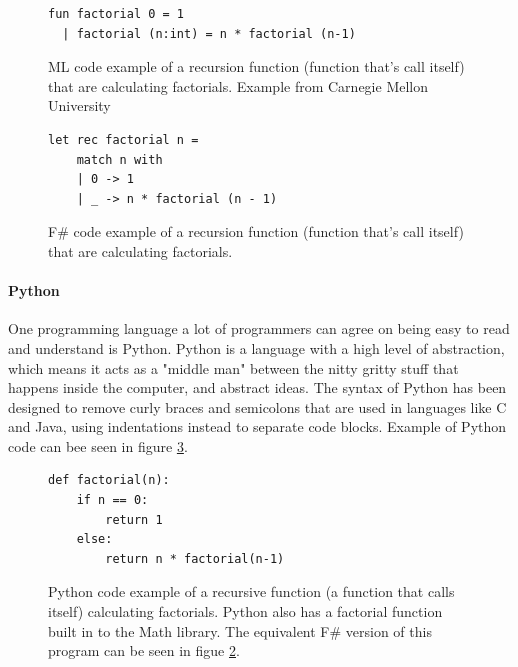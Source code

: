 \documentclass[12pt, a4paper]{article}
\begin{document}
\begin{figure}[!h]
	\begin{lstlisting}
fun factorial 0 = 1
  | factorial (n:int) = n * factorial (n-1)
	\end{lstlisting}
	\caption{ML code example of a recursion function (function that's call itself) that are calculating factorials. Example from Carnegie Mellon University\cite{carnegieMellon}}
	\label{fig:factorialMLExample}
\end{figure}

\begin{figure}[!h]
	\begin{lstlisting}
let rec factorial n =
    match n with
    | 0 -> 1
    | _ -> n * factorial (n - 1)
	\end{lstlisting}
	\caption{F\# code example of a recursion function (function that's call itself) that are calculating factorials.}
	\label{fig:factorialFsharpExample}
\end{figure}

\newpage
\paragraph{Python}

One programming language a lot of programmers can agree on being easy to read and understand is Python. Python is a language with a high level of abstraction, which means it acts as a "middle man" between the nitty gritty stuff that happens inside the computer, and abstract ideas. The syntax of Python has been designed to remove curly braces and semicolons that are used in languages like C and Java, using indentations instead to separate code blocks. Example of Python code can bee seen in figure \ref{fig:pythonFactorial}.\\


\begin{figure}[!h]
	\begin{lstlisting}
def factorial(n):
    if n == 0:
        return 1
    else:
        return n * factorial(n-1)
	\end{lstlisting}
	\caption{Python code example of a recursive function (a function that calls itself) calculating factorials. Python also has a factorial function built in to the Math library. The equivalent F\# version of this program can be seen in figue \ref{fig:factorialFsharpExample}.}
	\label{fig:pythonFactorial}
\end{figure}
\end{document}
